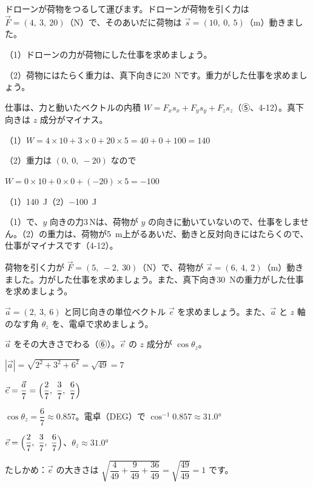 \begin{reidai}[空間の仕事]
ドローンが荷物をつるして運びます。ドローンが荷物を引く力は $\vec F=(4,\ 3,\ 20)$（N）で、そのあいだに荷物は $\vec s=(10,\ 0,\ 5)$（m）動きました。\par
（1）ドローンの力が荷物にした仕事を求めましょう。\par
（2）荷物にはたらく重力は、真下向きに\qty{20}{N}です。重力がした仕事を求めましょう。\par
\kangaekata 仕事は、力と動いたベクトルの内積 $W=F_xs_x+F_ys_y+F_zs_z$（⑤、4-12）。真下向きは $z$ 成分がマイナス。\par
\shiki（1）$W=4\times10+3\times0+20\times5=40+0+100=140$\par
\hspace*{2.6\zw}（2）重力は $(0,\ 0,\ -20)$ なので\par
\hspace*{4.6\zw}$W=0\times10+0\times0+(-20)\times5=-100$\par
\kotae （1）\qty{140}{J}\quad（2）\qty{-100}{J}
\end{reidai}
（1）で、$y$ 向きの力3\,Nは、荷物が $y$ の向きに動いていないので、仕事をしません。（2）の重力は、荷物が\qty{5}{m}上がるあいだ、動きと反対向きにはたらくので、仕事がマイナスです（4-12）。

\begin{jibun}
荷物を引く力が $\vec F=(5,\ -2,\ 30)$（N）で、荷物が $\vec s=(6,\ 4,\ 2)$（m）動きました。力がした仕事を求めましょう。また、真下向き\qty{30}{N}の重力がした仕事を求めましょう。
\end{jibun}

\begin{reidai}[単位ベクトルと方向余弦]
$\vec a=(2,\ 3,\ 6)$ と同じ向きの単位ベクトル $\vec e$ を求めましょう。また、$\vec a$ と $z$ 軸のなす角 $\theta_z$ を、電卓で求めましょう。\par
\kangaekata $\vec a$ をその大きさでわる（⑥）。$\vec e$ の $z$ 成分が $\cos\theta_z$。\par
\shiki $|\vec a|=\sqrt{2^2+3^2+6^2}=\sqrt{49}=7$\par
\hspace*{2.6\zw}$\vec e=\dfrac{\vec a}{7}=\Bigl(\dfrac{2}{7},\ \dfrac{3}{7},\ \dfrac{6}{7}\Bigr)$\par
\hspace*{2.6\zw}$\cos\theta_z=\dfrac{6}{7}\approx0.857$。電卓（DEG）で $\cos^{-1}0.857\approx31.0°$\par
\kotae $\vec e=\Bigl(\dfrac{2}{7},\ \dfrac{3}{7},\ \dfrac{6}{7}\Bigr)$、\enspace $\theta_z\approx31.0°$
\end{reidai}
たしかめ：$\vec e$ の大きさは $\sqrt{\dfrac{4}{49}+\dfrac{9}{49}+\dfrac{36}{49}}=\sqrt{\dfrac{49}{49}}=1$ です。


